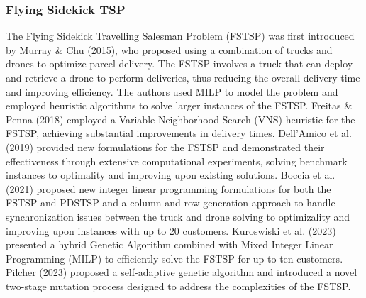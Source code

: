 \documentclass[twocolumn]{article}
\begin{document}
	\subsubsection{Flying Sidekick TSP}
	The Flying Sidekick Travelling Salesman Problem (FSTSP) was first introduced by Murray \& Chu (2015), who proposed using a combination of trucks and drones to optimize parcel delivery. The FSTSP involves a truck that can deploy and retrieve a drone to perform deliveries, thus reducing the overall delivery time and improving efficiency. The authors used MILP to model the problem and employed heuristic algorithms to solve larger instances of the FSTSP. Freitas \& Penna (2018) employed a Variable Neighborhood Search (VNS) heuristic for the FSTSP, achieving substantial improvements in delivery times. Dell’Amico et al. (2019) provided new formulations for the FSTSP and demonstrated their effectiveness through extensive computational experiments, solving benchmark instances to optimality and improving upon existing solutions. Boccia et al. (2021) proposed  new integer linear programming formulations for both the FSTSP and PDSTSP and a column-and-row generation approach to handle synchronization issues between the truck and drone solving to optimizality and improving upon instances with up to 20 customers. Kuroswiski et al. (2023) presented a hybrid Genetic Algorithm combined with Mixed Integer Linear Programming (MILP) to efficiently solve the FSTSP for up to ten customers. Pilcher (2023) proposed a self-adaptive genetic algorithm and introduced a novel two-stage mutation process designed to address the complexities of the FSTSP.
	\par
\end{document}
